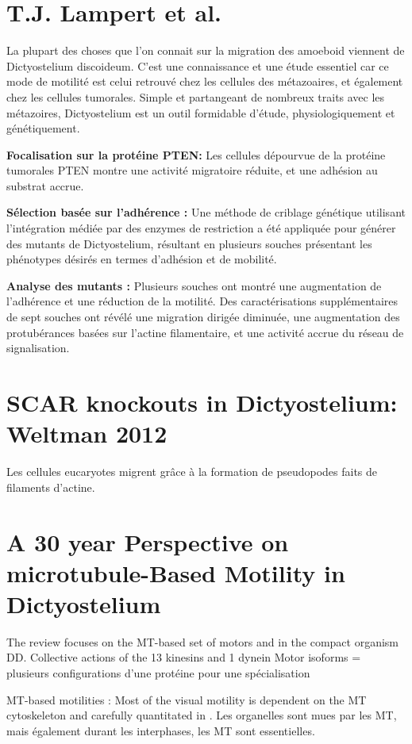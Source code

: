 \documentclass[twocolumn,10pt]{article} %
\begin{document}
\section{T.J. Lampert et al.}
\cite{Weber_2017}
La plupart des choses que l'on connait sur la migration des amoeboid viennent de Dictyostelium discoideum.
C'est une connaissance et une étude essentiel car ce mode de motilité est celui retrouvé chez les cellules des métazoaires,
et également chez les cellules tumorales. 
Simple et partangeant de nombreux traits avec les métazoires, Dictyostelium est un outil formidable d'étude, physiologiquement
et génétiquement. 

\textbf{Focalisation sur la protéine PTEN:}
Les cellules dépourvue de la protéine tumorales PTEN montre une activité migratoire réduite, et une adhésion au substrat accrue. 

\textbf{Sélection basée sur l'adhérence :} 
Une méthode de criblage génétique utilisant l'intégration médiée par des enzymes de 
restriction a été appliquée pour générer des mutants de Dictyostelium, résultant en plusieurs souches présentant les phénotypes 
désirés en termes d'adhésion et de mobilité.

\textbf{Analyse des mutants :} 
Plusieurs souches ont montré une augmentation de l'adhérence et une réduction de la motilité. 
Des caractérisations supplémentaires de sept souches ont révélé une migration dirigée diminuée, une augmentation des 
protubérances basées sur l'actine filamentaire, et une activité accrue du réseau de signalisation.




\section{SCAR knockouts in Dictyostelium: Weltman 2012}
Les cellules eucaryotes migrent grâce à la formation de pseudopodes faits de filaments d'actine. \cite{Veltman_2012}


\section{A 30 year Perspective on microtubule-Based Motility in Dictyostelium }
    \cite{Koonce_2020}
    The review focuses on the MT-based set of motors and in the compact organism DD. 
    Collective actions of the 13 kinesins and 1 dynein 
    Motor isoforms = plusieurs configurations d’une protéine pour une spécialisation

    MT-based motilities : Most of the visual motility is dependent on the MT cytoskeleton and carefully quantitated in
    \cite{Roos_1987}. Les organelles sont mues par les MT, mais également durant les interphases, les MT sont essentielles. 
\end{document}
